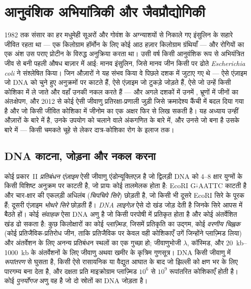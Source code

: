 \chapter{आनुवंशिक अभियांत्रिकी और जैवप्रौद्योगिकी}\label{ch:b3:genetic-engineering}

1982 तक संसार का हर मधुमेही सूअरों और गोवंश के अग्न्याशयों से निकाले गए
इंसुलिन के सहारे जीवित रहता था --- एक किलोग्राम हॉर्मोन के लिए कोई आठ
हज़ार किलोग्राम ग्रंथियाँ --- और रोगियों का एक अंश उस पराए प्रोटीन के
विरुद्ध अनुक्रिया करता था। उसी वर्ष किसी आनुवंशिक रूप से अभियंत्रित जीव
से बनी पहली औषध बाज़ार में आई: मानव इंसुलिन, जिसे मानव जीन किसी
 पर ढोते \emph{Escherichia coli} ने संश्लेषित किया। जिन
औज़ारों ने यह संभव किया वे पिछले दशक में जुटाए गए थे --- ऐसे एंज़ाइम जो
DNA को चुने हुए अनुक्रमों पर काटते हैं, ऐसे एंज़ाइम जो टुकड़े जोड़ते
हैं, ऐसे  जो उन्हें किसी कोशिका में ले जाते और वहाँ उनकी नकल
करते हैं --- और अगले दशकों में उनमें , भ्रूणों
में जीनों का अंतःक्षेपण, और 2012 से कोई ऐसी जीवाणु प्रतिरक्षा-प्रणाली
जुड़ी जिसे क्रमादेश्य कैंची में बदल दिया गया है और जो किसी जीवित कोशिका
में जीनोम का एक अक्षर फिर से लिख सकती है। यह अध्याय उन्हीं औज़ारों के
बारे में है, उनके उपयोग को चलाने वाले अंकगणित के बारे में, और उनसे जो
बना है उसके बारे में --- किसी चमकते चूहे से लेकर दात्र-कोशिका रोग के
इलाज तक।

\section{DNA काटना, जोड़ना और नकल करना}

\begin{definition}[प्रतिबंधन एंज़ाइम, लाइगेज़ और संवाहक]\label{def:b3:genetic-engineering:tools}
कोई प्रकार~II \emph{प्रतिबंधन एंज़ाइम} ऐसी जीवाणु एंडोन्यूक्लिएज़ है जो
द्विलड़ी DNA को \numrange{4}{8} क्षार युग्मों के किसी विशिष्ट अनुक्रम
पर काटती है, जो प्रायः कोई तालमेलक होता है: EcoRI G$^{\downarrow}$AATTC
काटती है और चार-क्षार की एकलड़ी अधिलंब (\emph{चिपचिपे सिरे}) छोड़ती है,
जो किसी भी दूसरे EcoRI सिरे के पूरक हैं; दूसरी एंज़ाइम \emph{भोथरे
सिरे} छोड़ती हैं। \emph{DNA लाइगेज़} ऐसे दो खंड जोड़ देती है जिनके सिरे
आपस में बैठते हों। कोई \emph{संवाहक} ऐसा DNA अणु है जो किसी परपोषी में
प्रतिकृत होता है और कोई अंतर्वेशित खंड ढो सकता है: कुछ किलोक्षारों का
कोई \emph{प्लाज़्मिड}, जिसमें प्रतिकृति का उद्गम, कोई
\emph{वरणीय चिह्नक} (कोई प्रतिजैविक-प्रतिरोध जीन, ताकि प्रतिजैविक पर
केवल वही कोशिकाएँ उगें जिन्होंने प्लाज़्मिड लिया) और अंतर्वेशन के लिए
अनन्य प्रतिबंधन स्थलों का एक गुच्छा हो; जीवाणुभोजी $\lambda$, कॉस्मिड,
और \qtyrange{20}{1000}{kb} के अंतर्वेशनों के लिए जीवाणु अथवा खमीर के
कृत्रिम गुणसूत्र। DNA किसी जीवाणु में \emph{रूपांतरण} से घुसता है, किसी
ऐसे रासायनिक या वैद्युत आघात के बाद जो झिल्ली को क्षण भर के लिए पारगम्य
बना देता है, और दक्षता प्रति माइक्रोग्राम प्लाज़्मिड $10^{6}$ से $10^{9}$
रूपांतरित कोशिकाएँ होती है। कोई \emph{पुनर्योगज} अणु वह है जो दो
स्रोतों का DNA जोड़ता है।
\end{definition}

